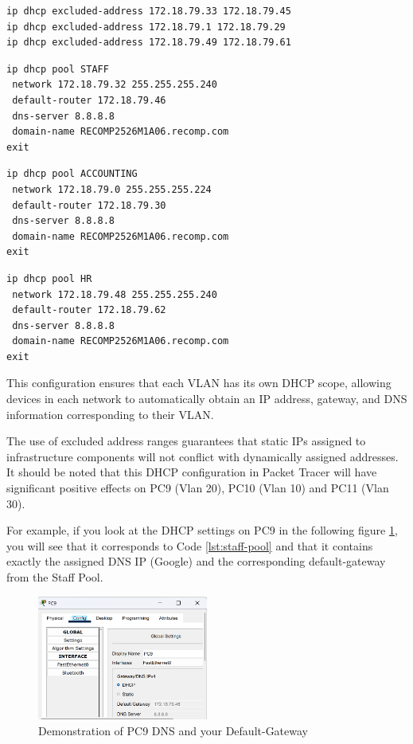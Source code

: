 \begin{lstlisting}[caption={Exclusion of static addresses already defined to avoid errors}, label={lst:errors}]
ip dhcp excluded-address 172.18.79.33 172.18.79.45
ip dhcp excluded-address 172.18.79.1 172.18.79.29
ip dhcp excluded-address 172.18.79.49 172.18.79.61
\end{lstlisting}

\begin{lstlisting}[caption={Creation of a DHCP pool called STAFF}, label={lst:staff-pool}]
ip dhcp pool STAFF
 network 172.18.79.32 255.255.255.240
 default-router 172.18.79.46
 dns-server 8.8.8.8
 domain-name RECOMP2526M1A06.recomp.com 
exit
\end{lstlisting}

\begin{lstlisting}[caption={Creation of a DHCP pool called ACCOUNTING}, label={lst:ACCOUNTING-pool}]
ip dhcp pool ACCOUNTING
 network 172.18.79.0 255.255.255.224
 default-router 172.18.79.30
 dns-server 8.8.8.8
 domain-name RECOMP2526M1A06.recomp.com
exit
\end{lstlisting}

\begin{lstlisting}[caption={Creation of a DHCP pool called HR}, label={lst:HR-pool}]
ip dhcp pool HR
 network 172.18.79.48 255.255.255.240
 default-router 172.18.79.62
 dns-server 8.8.8.8
 domain-name RECOMP2526M1A06.recomp.com
exit
\end{lstlisting}

This configuration ensures that each VLAN has its own DHCP scope, allowing devices in each network to automatically obtain an IP address, gateway, and DNS information corresponding to their VLAN. 


The use of excluded address ranges guarantees that static IPs assigned to infrastructure components will not conflict with dynamically assigned addresses.
It should be noted that this DHCP configuration in Packet Tracer will have significant positive effects on PC9 (Vlan 20), PC10 (Vlan 10) and PC11 (Vlan 30).

\newpage
For example, if you look at the DHCP settings on PC9 in the following figure \ref{fig:munich_pc9}, you will see that it corresponds to Code \ref{lst:staff-pool} and that it contains exactly the assigned DNS IP (Google) and the corresponding default-gateway from the Staff Pool.

\begin{figure}[!h]
\centering
\includegraphics[width=0.5\textwidth]{figures/pc9_conf_example.png}
\caption{\label{fig:munich_pc9}Demonstration of PC9 DNS and your Default-Gateway}
\end{figure}

